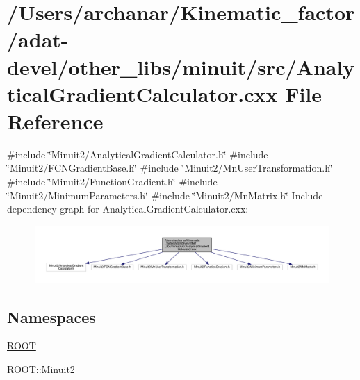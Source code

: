 \hypertarget{adat-devel_2other__libs_2minuit_2src_2AnalyticalGradientCalculator_8cxx}{}\section{/\+Users/archanar/\+Kinematic\+\_\+factor/adat-\/devel/other\+\_\+libs/minuit/src/\+Analytical\+Gradient\+Calculator.cxx File Reference}
\label{adat-devel_2other__libs_2minuit_2src_2AnalyticalGradientCalculator_8cxx}
{\ttfamily \#include \char`\"{}Minuit2/\+Analytical\+Gradient\+Calculator.\+h\char`\"{}}\newline
{\ttfamily \#include \char`\"{}Minuit2/\+F\+C\+N\+Gradient\+Base.\+h\char`\"{}}\newline
{\ttfamily \#include \char`\"{}Minuit2/\+Mn\+User\+Transformation.\+h\char`\"{}}\newline
{\ttfamily \#include \char`\"{}Minuit2/\+Function\+Gradient.\+h\char`\"{}}\newline
{\ttfamily \#include \char`\"{}Minuit2/\+Minimum\+Parameters.\+h\char`\"{}}\newline
{\ttfamily \#include \char`\"{}Minuit2/\+Mn\+Matrix.\+h\char`\"{}}\newline
Include dependency graph for Analytical\+Gradient\+Calculator.\+cxx\+:
\nopagebreak
\begin{figure}[H]
\begin{center}
\leavevmode
\includegraphics[width=350pt]{d8/db4/adat-devel_2other__libs_2minuit_2src_2AnalyticalGradientCalculator_8cxx__incl}
\end{center}
\end{figure}
\subsection*{Namespaces}
\begin{DoxyCompactItemize}
\item 
 \mbox{\hyperlink{namespaceROOT}{R\+O\+OT}}
\item 
 \mbox{\hyperlink{namespaceROOT_1_1Minuit2}{R\+O\+O\+T\+::\+Minuit2}}
\end{DoxyCompactItemize}
